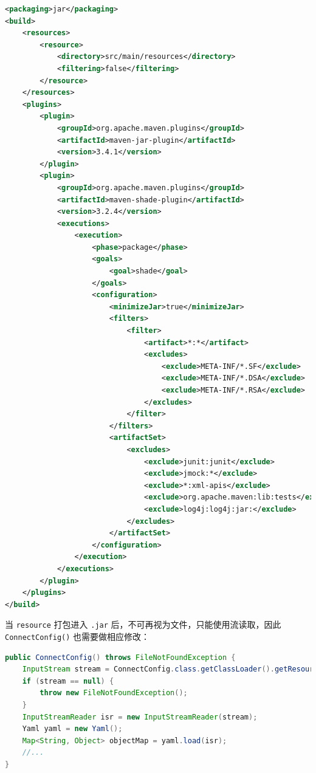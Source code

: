 \documentclass[a4paper,oneside]{ctexbook}
\begin{document}
\begin{lstlisting}[language=xml, caption=pom.xml,label=lst:pom]
<packaging>jar</packaging>
<build>
    <resources>
        <resource>
            <directory>src/main/resources</directory>
            <filtering>false</filtering>
        </resource>
    </resources>
    <plugins>
        <plugin>
            <groupId>org.apache.maven.plugins</groupId>
            <artifactId>maven-jar-plugin</artifactId>
            <version>3.4.1</version>
        </plugin>
        <plugin>
            <groupId>org.apache.maven.plugins</groupId>
            <artifactId>maven-shade-plugin</artifactId>
            <version>3.2.4</version>
            <executions>
                <execution>
                    <phase>package</phase>
                    <goals>
                        <goal>shade</goal>
                    </goals>
                    <configuration>
                        <minimizeJar>true</minimizeJar>
                        <filters>
                            <filter>
                                <artifact>*:*</artifact>
                                <excludes>
                                    <exclude>META-INF/*.SF</exclude>
                                    <exclude>META-INF/*.DSA</exclude>
                                    <exclude>META-INF/*.RSA</exclude>
                                </excludes>
                            </filter>
                        </filters>
                        <artifactSet>
                            <excludes>
                                <exclude>junit:junit</exclude>
                                <exclude>jmock:*</exclude>
                                <exclude>*:xml-apis</exclude>
                                <exclude>org.apache.maven:lib:tests</exclude>
                                <exclude>log4j:log4j:jar:</exclude>
                            </excludes>
                        </artifactSet>
                    </configuration>
                </execution>
            </executions>
        </plugin>
    </plugins>
</build>
\end{lstlisting}

当 \verb|resource| 打包进入 \verb|.jar| 后，不可再视为文件，只能使用流读取，因此 \verb|ConnectConfig()| 也需要做相应修改：

\begin{lstlisting}[language=java, caption=更改为流读取,label=lst:stream]
public ConnectConfig() throws FileNotFoundException {
    InputStream stream = ConnectConfig.class.getClassLoader().getResourceAsStream("application.yaml");
    if (stream == null) {
        throw new FileNotFoundException();
    }
    InputStreamReader isr = new InputStreamReader(stream);
    Yaml yaml = new Yaml();
    Map<String, Object> objectMap = yaml.load(isr);
    //...
}
\end{lstlisting}
\end{document}
